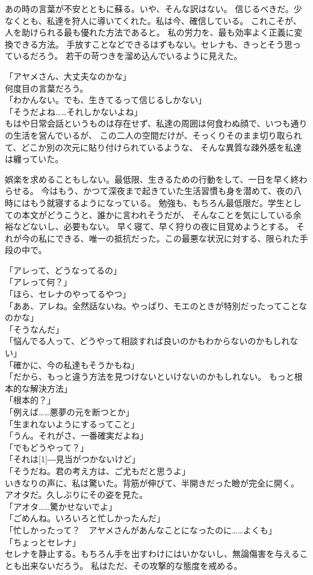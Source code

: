 \documentclass[../IHMain]{subfiles}
\begin{document}
あの時の言葉が不安とともに蘇る。いや、そんな訳はない。
信じるべきだ。少なくとも、私達を狩人に導いてくれた。私は今、確信している。
これこそが、人を助けられる最も優れた方法であると。
私の労力を、最も効率よく正義に変換できる方法。
手放すことなどできるはずもない。セレナも、きっとそう思っているだろう。
若干の苛つきを溜め込んでいるように見えた。

「アヤメさん、大丈夫なのかな」\\
何度目の言葉だろう。\\
「わかんない。でも、生きてるって信じるしかない」\\
「そうだよね……それしかないよね」\\
もはや日常会話というものは存在せず、私達の周囲は何食わぬ顔で、いつも通りの生活を営んでいるが、
この二人の空間だけが、そっくりそのまま切り取られて、どこか別の次元に貼り付けられているような、
そんな異質な疎外感を私達は纏っていた。

娯楽を求めることもしない。最低限、生きるための行動をして、一日を早く終わらせる。
今はもう、かつて深夜まで起きていた生活習慣も身を潜めて、夜の八時にはもう就寝するようになっている。
勉強も、もちろん最低限だ。学生としての本文がどうこうと、誰かに言われそうだが、
そんなことを気にしている余裕などないし、必要もない。
早く寝て、早く狩りの夜に目覚めようとする。
それが今の私にできる、唯一の抵抗だった。この最悪な状況に対する、限られた手段の中で。

「アレって、どうなってるの」\\
「アレって何？」\\
「ほら、セレナのやってるやつ」\\
「ああ、アレね。全然話ないね。やっぱり、モエのときが特別だったってことなのかな」\\
「そうなんだ」\\
「悩んでる人って、どうやって相談すれば良いのかもわからないのかもしれない」\\
「確かに、今の私達もそうかもね」\\
「だから、もっと違う方法を見つけないといけないのかもしれない。
もっと根本的な解決方法」\\
「根本的？」\\
「例えば……悪夢の元を断つとか」\\
「生まれないようにするってこと」\\
「うん。それがさ、一番確実だよね」\\
「でもどうやって？」\\
「それは\scalebox{3}[1]{―}見当がつかないけど」\\
「そうだね。君の考え方は、ご尤もだと思うよ」\\
いきなりの声に、私は驚いた。背筋が伸びて、半開きだった瞼が完全に開く。
アオタだ。久しぶりにその姿を見た。\\
「アオタ……驚かせないでよ」\\
「ごめんね。いろいろと忙しかったんだ」\\
「忙しかったって？　アヤメさんがあんなことになったのに……よくも」\\
「ちょっとセレナ」\\
セレナを静止する。もちろん手を出すわけにはいかないし、無論傷害を与えることも出来ないだろう。
私はただ、その攻撃的な態度を戒める。
\end{document}
